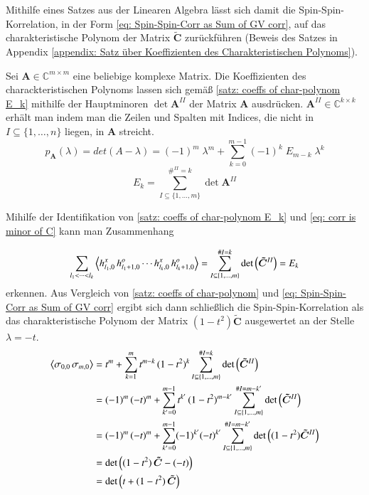 \noindent Mithilfe eines Satzes aus der Linearen Algebra lässt sich damit die Spin-Spin-Korrelation, in der Form \eqref{eq: Spin-Spin-Corr as Sum of GV corr},  auf das charakteristische Polynom der Matrix $\bm{\tilde{C}}$ zurückführen (Beweis des Satzes in Appendix \ref{appendix: Satz über Koeffizienten des Charakteristischen Polynoms}).

\begin{grayframe}[frametitle = {Satz über die Koeffizienten des charackteristischen Polynoms}]

Sei $\bm{A}\in \mathbb{C}^{m\times m}$ eine beliebige komplexe Matrix. Die Koeffizienten des charackteristischen Polynoms lassen sich gemäß \eqref{satz: coeffs of char-polynom E_k} mithilfe der Hauptminoren $\det{\bm{A}^{II}}$ der Matrix $\bm{A}$ ausdrücken. $\bm{A}^{II} \in  \mathbb{C}^{k\times k}$ erhält man indem man die Zeilen und Spalten mit Indices, die nicht in $I\subseteq \{1,\dots,n\}$ liegen, in $\bm{A}$ streicht. 
\begin{equation} \label{satz: coeffs of char-polynom}
p_{\bm{A}}(\lambda) = det(A - \lambda) = (-1)^m \;\lambda^m + \sum_{k = 0}^{m-1} (-1)^k \;E_{m-k} \;\lambda^k
\end{equation}
\begin{equation} \label{satz: coeffs of char-polynom E_k}
E_k = \sum_{{I} \subseteq \{1,\dots,m\} }^{\#^{II} = k} \det{\bm{A}^{II}}
\end{equation}
\end{grayframe}

\noindent Mihilfe der Identifikation von \eqref{satz: coeffs of char-polynom E_k} und \eqref{eq: corr is minor of C} kann man Zusammenhang 

\begin{equation}
\sum_{l_1 < \dots < l_k}  \left\langle h_{l_1,0}^x\, h_{l_1+1,0}^o \cdots h_{l_k,0}^x\, h_{l_k+1,0}^o \right\rangle = \sum_{{I} \subseteq \{1,\dots,m\} }^{\#I = k} \mathrm{det}\left( \bm{\tilde{C}}^{II} \right) = E_{k}
\end{equation}
erkennen. Aus Vergleich von \eqref{satz: coeffs of char-polynom} und \eqref{eq: Spin-Spin-Corr as Sum of GV corr} ergibt sich dann schließlich die Spin-Spin-Korrelation als das charakteristische Polynom der Matrix $(1-t^2)\bm{\tilde{C}}$ ausgewertet an der Stelle $\lambda = -t$.
\begin{align}
 \left\langle \sigma_{0,0}\, \sigma_{m,0} \right\rangle 
 &= t^m  + \sum_{k = 1}^{m} t^{m-k} \, (1-t^2)^{k} \sum_{I \subseteq \{1,\dots,m\} }^{\#I = k} \mathrm{det}\left( \bm{\tilde{C}}^{II} \right) \nonumber \\
 &= (-1)^m\,(-t)^m  + \sum_{k' = 0}^{m-1} t^{k'} \, (1-t^2)^{m-k'} \sum_{I \subseteq \{1,\dots,m\} }^{\#I = m-k'} \mathrm{det}\left( \bm{\tilde{C}}^{II} \right) \nonumber\\
 &= (-1)^m\,(-t)^m  + \sum_{k' = 0}^{m-1} (-1)^{k'} (-t)^{k'} \sum_{I \subseteq \{1,\dots,m\} }^{\#I = m-k'}  \mathrm{det}\left( (1-t^2)\bm{\tilde{C}}^{II} \right) \nonumber \\
 &= \mathrm{det}\left( (1-t^2)\,\bm{\tilde{C}} - (-t) \right) \nonumber \\
 &= \mathrm{det}\left( t + (1-t^2)\,\bm{\tilde{C}} \right) \nonumber
\end{align}

